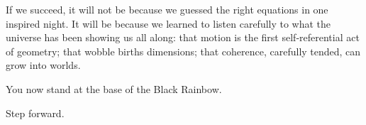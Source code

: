 If we succeed, it will not be because we guessed the right equations in one inspired night. It will be because we learned to listen carefully to what the universe has been showing us all along: that motion is the first self‑referential act of geometry; that wobble births dimensions; that coherence, carefully tended, can grow into worlds.

You now stand at the base of the Black Rainbow.

Step forward.
